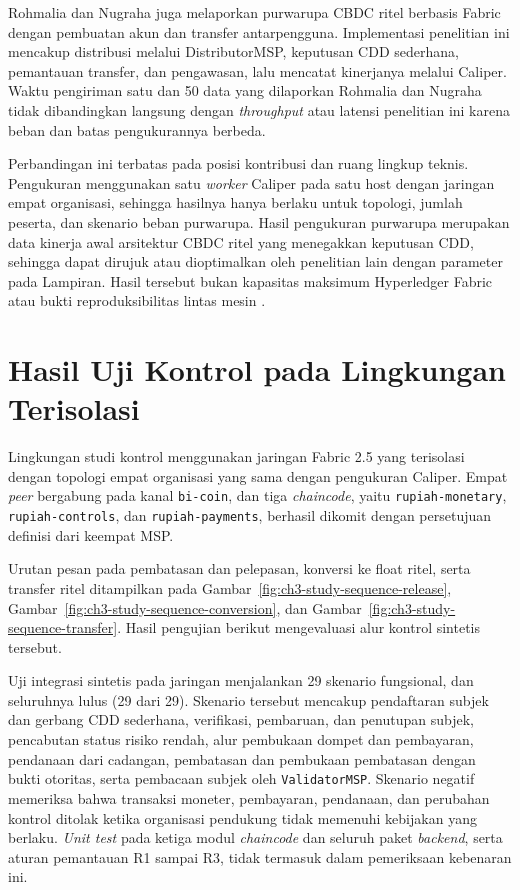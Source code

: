 Rohmalia dan Nugraha \cite{rohmalia2023retail} juga melaporkan purwarupa CBDC
ritel berbasis Fabric dengan pembuatan akun dan transfer antarpengguna.
Implementasi penelitian ini mencakup distribusi melalui DistributorMSP, keputusan CDD
sederhana, pemantauan transfer, dan pengawasan, lalu mencatat kinerjanya melalui Caliper. Waktu
pengiriman satu dan 50 data yang dilaporkan Rohmalia dan Nugraha tidak
dibandingkan langsung dengan \textit{throughput} atau latensi penelitian ini
karena beban dan batas pengukurannya berbeda.

Perbandingan ini terbatas pada posisi kontribusi dan ruang lingkup teknis.
Pengukuran menggunakan satu \textit{worker} Caliper pada satu host dengan jaringan
empat organisasi, sehingga hasilnya hanya berlaku untuk topologi, jumlah peserta,
dan skenario beban purwarupa. Hasil pengukuran purwarupa merupakan data kinerja
awal arsitektur CBDC ritel yang menegakkan keputusan CDD, sehingga dapat dirujuk
atau dioptimalkan oleh penelitian lain dengan parameter pada Lampiran. Hasil
tersebut bukan kapasitas maksimum Hyperledger Fabric atau bukti
reproduksibilitas lintas mesin \cite{fabric_perf2023}.

\section{Hasil Uji Kontrol pada Lingkungan Terisolasi}

Lingkungan studi kontrol menggunakan jaringan Fabric 2.5 yang terisolasi dengan
topologi empat organisasi yang sama dengan pengukuran Caliper. Empat \textit{peer}
bergabung pada kanal \texttt{bi-coin}, dan tiga \textit{chaincode}, yaitu
\texttt{rupiah-monetary}, \texttt{rupiah-controls}, dan \texttt{rupiah-payments},
berhasil dikomit dengan persetujuan definisi dari keempat MSP.

Urutan pesan pada pembatasan dan pelepasan, konversi ke float ritel, serta
transfer ritel ditampilkan pada Gambar~\ref{fig:ch3-study-sequence-release},
Gambar~\ref{fig:ch3-study-sequence-conversion}, dan
Gambar~\ref{fig:ch3-study-sequence-transfer}. Hasil pengujian berikut
mengevaluasi alur kontrol sintetis tersebut.

Uji integrasi sintetis pada jaringan menjalankan 29 skenario fungsional, dan seluruhnya lulus (29 dari 29). Skenario tersebut mencakup pendaftaran subjek dan gerbang CDD sederhana, verifikasi, pembaruan, dan penutupan subjek, pencabutan status risiko rendah, alur
pembukaan dompet dan pembayaran, pendanaan dari cadangan, pembatasan dan
pembukaan pembatasan dengan bukti otoritas, serta pembacaan subjek oleh
\texttt{ValidatorMSP}. Skenario negatif memeriksa bahwa transaksi moneter, pembayaran,
pendanaan, dan perubahan kontrol ditolak ketika organisasi pendukung tidak memenuhi
kebijakan yang berlaku. \textit{Unit test} pada ketiga modul \textit{chaincode} dan seluruh paket \textit{backend}, serta aturan pemantauan R1 sampai R3, tidak termasuk dalam pemeriksaan kebenaran ini.

